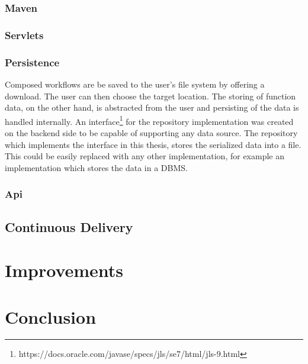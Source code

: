 \documentclass[a4paper,11pt,pdftex,halfparskip,cleardoubleempty]{scrbook}
\begin{document}
\subsubsection{Maven}
\subsubsection{Servlets}
\subsubsection{Persistence}
\label{Backend-Persistence}

Composed workflows are be saved to the user's file system by offering a download. The user can then choose the target location.
The storing of function data, on the other hand, is abstracted from the user and persisting of the data is handled internally.
An interface\footnote{https://docs.oracle.com/javase/specs/jls/se7/html/jls-9.html} for the repository implementation was created on the backend side to be capable of supporting any data source. The repository which implements the interface in this thesis, stores the serialized data into a file. This could be easily replaced with any other implementation, for example an implementation which stores the data in a DBMS.

\subsubsection{Api}


\subsection{Continuous Delivery}

\section{Improvements}

\section{Conclusion}


\nocite{*}



\end{document}
